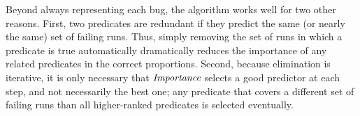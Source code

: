 Beyond always representing each bug, the algorithm works well for two
other reasons.  First, two predicates are redundant if they predict
the same (or nearly the same) set of failing runs.  Thus, simply
removing the set of runs in which a predicate is true automatically
dramatically reduces the importance of any related predicates in the
correct proportions. Second, because elimination is iterative, it is
only necessary that $\textit{Importance}$ selects a good predictor at each
step, and not necessarily the best one; any predicate that covers a
different set of failing runs than all higher-ranked predicates is
selected eventually.

